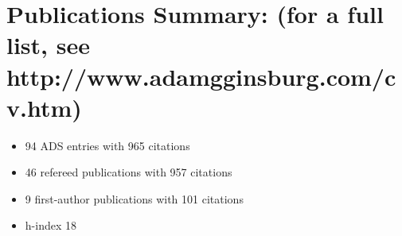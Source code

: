 \setlength{\extrarowheight}{0pt}
\section*{Publications Summary: (for a full list, see http://www.adamgginsburg.com/cv.htm)}
\begin{itemize}
\itemsep-3pt
\item 94 ADS entries with 965 citations 
\item 46 refereed publications with 957 citations
\item 9 first-author publications with 101 citations
\item h-index 18

\end{itemize}


